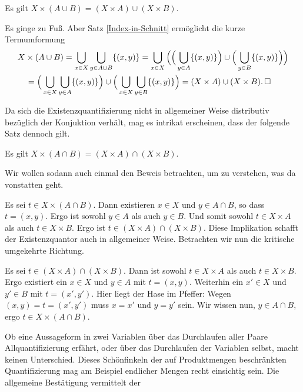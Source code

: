 \begin{Satz}
Es gilt $X\times (A\cup B) = (X\times A)\cup (X\times B)$.
\end{Satz}
\begin{Beweis}
Es ginge zu Fuß. Aber Satz \ref{Index-in-Schnitt} ermöglicht die
kurze Termumformung%
\begin{align*}
& X\times (A\cup B) = \bigcup_{x\in X}\bigcup_{y\in A\cup B} \{(x,y)\}
= \bigcup_{x\in X}\Big(\Big(\bigcup_{y\in A}\{(x,y)\}\Big)\cup \Big(\bigcup_{y\in B}\{(x,y)\}\Big)\Big)\\
&\quad = \Big(\bigcup_{x\in X}\bigcup_{y\in A}\{(x,y)\}\Big)\cup\Big(\bigcup_{x\in X}\bigcup_{y\in B}\{(x,y)\}\Big)
= (X\times A)\cup (X\times B).\,\Box
\end{align*}
\end{Beweis}

\noindent
Da sich die Existenzquantifizierung nicht in allgemeiner Weise
distributiv bezüglich der Konjuktion verhält, mag es intrikat erscheinen,
dass der folgende Satz dennoch gilt.
\begin{Satz}
Es gilt $X\times (A\cap B) = (X\times A)\cap (X\times B)$.
\end{Satz}
\begin{Beweis}
Wir wollen sodann auch einmal den Beweis betrachten, um zu verstehen,
was da vonstatten geht.

Es sei $t\in X\times (A\cap B)$. Dann existieren $x\in X$ und
$y\in A\cap B$, so dass $t=(x,y)$. Ergo ist sowohl $y\in A$ als
auch $y\in B$. Und somit sowohl $t\in X\times A$ als auch
$t\in X\times B$. Ergo ist $t\in (X\times A)\cap (X\times B)$.
Diese Implikation schafft der Existenzquantor auch in allgemeiner
Weise. Betrachten wir nun die kritische umgekehrte Richtung.

Es sei $t\in (X\times A)\cap (X\times B)$. Dann ist sowohl
$t\in X\times A$ als auch $t\in X\times B$. Ergo existiert ein
$x\in X$ und $y\in A$ mit $t=(x,y)$. Weiterhin ein $x'\in X$ und
$y'\in B$ mit $t=(x',y')$. Hier liegt der Hase im Pfeffer: Wegen
$(x,y)=t=(x',y')$ muss $x=x'$ und $y=y'$ sein. Wir wissen nun,
$y\in A\cap B$, ergo $t\in X\times (A\cap B)$.\,\qedsymbol
\end{Beweis}

\noindent
Ob eine Aussageform in zwei Variablen über das Durchlaufen aller Paare
Allquantifizierung erfährt, oder über das Durchlaufen der Variablen
selbst, macht keinen Unterschied. Dieses Schönfinkeln der auf
Produktmengen beschränkten Quantifizierung mag am Beispiel endlicher
Mengen recht einsichtig sein. Die allgemeine Bestätigung vermittelt der

